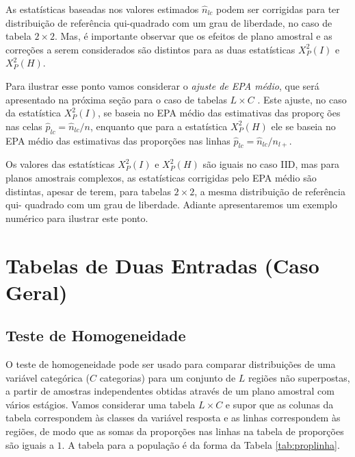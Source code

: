 \documentclass[]{book}
\numberwithin{example}{chapter}
\numberwithin{remark}{chapter}
\numberwithin{definition}{chapter}
\begin{document}
As estatísticas baseadas nos valores estimados \(\hat{n}_{lc}\) podem
ser corrigidas para ter distribuição de referência qui-quadrado com um
grau de liberdade, no caso de tabela \(2\times 2\). Mas, é importante
observar que os efeitos de plano amostral e as correções a serem
considerados são distintos para as duas estatísticas
\(X_{P}^{2}\left( I\right)\) e \(X_{P}^{2}\left(H\right)\).

Para ilustrar esse ponto vamos considerar o \emph{ajuste de EPA médio},
que será apresentado na próxima seção para o caso de tabelas
\(L\times C\) . Este ajuste, no caso da estatística
\(X_{P}^{2}\left( I\right)\), se baseia no EPA médio das estimativas das
proporç ões nas celas \(\hat{p}_{lc}=\hat{n}_{lc}/n\), enquanto que para
a estatística \(X_{P}^{2}\left( H\right)\) ele se baseia no EPA médio
das estimativas das proporções nas linhas
\(\hat{p}_{lc}=\hat{n} _{lc}/n_{l+}\).

Os valores das estatísticas \(X_{P}^{2}\left( I\right)\) e
\(X_{P}^{2}\left( H\right)\) são iguais no caso IID, mas para planos
amostrais complexos, as estatísticas corrigidas pelo EPA médio são
distintas, apesar de terem, para tabelas \(2\times 2\), a mesma
distribuição de referência qui- quadrado com um grau de liberdade.
Adiante apresentaremos um exemplo numérico para ilustrar este ponto.

\section{Tabelas de Duas Entradas (Caso
Geral)}\label{tabelas-de-duas-entradas-caso-geral}

\subsection{Teste de Homogeneidade}\label{teste-de-homogeneidade-1}

O teste de homogeneidade pode ser usado para comparar distribuições de
uma variável categórica (\(C\) categorias) para um conjunto de \(L\)
regiões não superpostas, a partir de amostras independentes obtidas
através de um plano amostral com vários estágios. Vamos considerar uma
tabela \(L\times C\) e supor que as colunas da tabela correspondem às
classes da variável resposta e as linhas correspondem às regiões, de
modo que as somas da proporções nas linhas na tabela de proporções são
iguais a \(1\). A tabela para a população é da forma da Tabela
\ref{tab:proplinha}.
\end{document}
